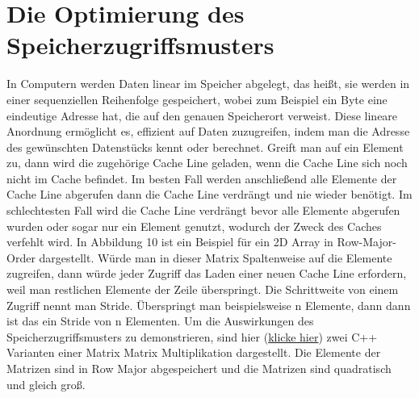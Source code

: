 \documentclass[sigconf,language=ngerman]{acmart}
\begin{document}
\section{Die Optimierung des Speicherzugriffsmusters}
    In Computern werden Daten linear im Speicher abgelegt, das heißt, sie werden in einer sequenziellen Reihenfolge gespeichert, 
    wobei zum Beispiel ein Byte eine eindeutige Adresse hat, die auf den genauen Speicherort verweist. Diese lineare Anordnung ermöglicht es, 
    effizient auf Daten zuzugreifen, 
    indem man die Adresse des gewünschten Datenstücks kennt oder berechnet.
    Greift man auf ein Element zu, dann wird die zugehörige Cache Line geladen, wenn die Cache Line sich noch nicht im Cache befindet.
    Im besten Fall werden anschließend alle Elemente der Cache Line abgerufen dann die Cache Line verdrängt 
    und nie wieder benötigt. Im schlechtesten Fall wird die Cache Line verdrängt bevor alle Elemente abgerufen wurden 
    oder sogar nur ein Element genutzt, wodurch der Zweck des Caches verfehlt wird.
    In Abbildung 10 ist ein Beispiel für ein 2D Array in Row-Major-Order dargestellt. %
    Würde man in dieser Matrix Spaltenweise auf die Elemente zugreifen,
    dann würde jeder Zugriff das Laden einer neuen Cache Line erfordern, 
    weil man restlichen Elemente der Zeile überspringt.
    Die Schrittweite von einem Zugriff nennt man Stride.
    Überspringt man beispielsweise n Elemente, dann dann ist das ein Stride von n Elementen.
    Um die Auswirkungen des Speicherzugriffsmusters zu demonstrieren, sind hier (\hyperref[fig:Zeilenorientierte Matrix Matrix Multiplikation]{klicke hier}) zwei C++ 
    Varianten einer Matrix Matrix Multiplikation dargestellt. Die Elemente der Matrizen sind 
    in Row Major abgespeichert und die Matrizen sind quadratisch und gleich groß.
\end{document}
